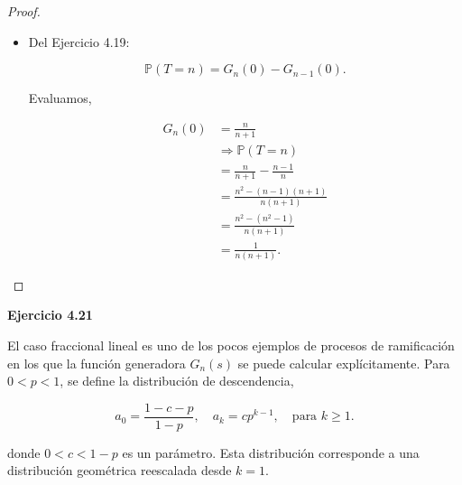 \documentclass{article}
\begin{document}
\begin{proof}
\begin{itemize}
Se cumple la fórmula por inducción.

\item[(c)] 

Del Ejercicio 4.19:

\[
\mathbb{P}(T = n) = G_n(0) - G_{n-1}(0).
\]

Evaluamos,

\begin{align*}
 G_n(0) &= \frac{n}{n + 1} \\
& \Rightarrow \mathbb{P}(T = n) \\ 
&= \frac{n}{n + 1} - \frac{n - 1}{n} \\ 
&= \frac{n^2 - (n - 1)(n + 1)}{n(n + 1)} \\ 
&= \frac{n^2 - (n^2 - 1)}{n(n + 1)} \\
&= \frac{1}{n(n + 1)}.
\end{align*}

\end{itemize}
\end{proof}


\textbf{Ejercicio 4.21}

El caso fraccional lineal es uno de los pocos ejemplos de procesos de ramificación en los que la función generadora \( G_n(s) \) se puede calcular explícitamente. Para \( 0 < p < 1 \), se define la distribución de descendencia,

\[
a_0 = \frac{1 - c - p}{1 - p}, \quad a_k = c p^{k-1}, \quad \text{para } k \geq 1.
\]

donde \( 0 < c < 1 - p \) es un parámetro. Esta distribución corresponde a una distribución geométrica reescalada desde \( k = 1 \).
\end{document}
